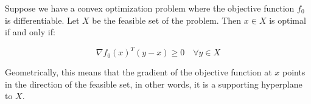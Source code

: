 Suppose we have a convex optimization problem where the objective function $f_0$ is differentiable. Let $X$ be the feasible set of the problem. Then $x \in X$ is optimal if and only if:

\begin{equation}
    \nabla f_0(x)^T(y-x) \geq 0 \quad \forall y \in X
\end{equation}

Geometrically, this means that the gradient of the objective function at $x$ points in the direction of the feasible set, in other words, it is a supporting hyperplane to $X$.

\begin{center}
\end{center}

